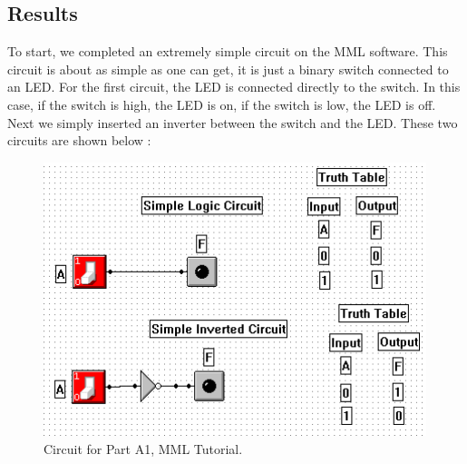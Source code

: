 \documentclass[a4paper,11pt]{article}
\begin{document}
\subsection{Results}
To start, we completed an extremely simple circuit on the MML software. This circuit is about as simple as one can get, it is just a binary switch connected to an LED. For the first circuit, the LED is connected directly to the switch. In this case, if the switch is high, the LED is on, if the switch is low, the LED is off. Next we simply inserted an inverter between the switch and the LED. These two circuits are shown below :  
\begin{figure}[h!]
   \centering
     \includegraphics[width=4.4in]{PartACircuit}
   \caption{Circuit for Part A1, MML Tutorial.}
   \label{fig:map}
\end{figure} 
\end{document}
